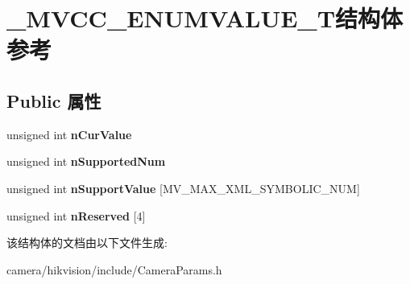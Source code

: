 \hypertarget{struct___m_v_c_c___e_n_u_m_v_a_l_u_e___t}{}\section{\+\_\+\+M\+V\+C\+C\+\_\+\+E\+N\+U\+M\+V\+A\+L\+U\+E\+\_\+\+T结构体 参考}
\label{struct___m_v_c_c___e_n_u_m_v_a_l_u_e___t}
\subsection*{Public 属性}
\begin{DoxyCompactItemize}
\item 
\mbox{\label{struct___m_v_c_c___e_n_u_m_v_a_l_u_e___t_ab30f0fe7ee9b0eacf1286584bf579b4a}} 
unsigned int {\bfseries n\+Cur\+Value}
\item 
\mbox{\label{struct___m_v_c_c___e_n_u_m_v_a_l_u_e___t_a1a43bc56d480394d927e8ded7ad94f62}} 
unsigned int {\bfseries n\+Supported\+Num}
\item 
\mbox{\label{struct___m_v_c_c___e_n_u_m_v_a_l_u_e___t_ac55c1e13011a2a27acfa614f76a55bf4}} 
unsigned int {\bfseries n\+Support\+Value} \mbox{[}M\+V\+\_\+\+M\+A\+X\+\_\+\+X\+M\+L\+\_\+\+S\+Y\+M\+B\+O\+L\+I\+C\+\_\+\+N\+UM\mbox{]}
\item 
\mbox{\label{struct___m_v_c_c___e_n_u_m_v_a_l_u_e___t_a9cf20dd217f5450569ccebd640003fd0}} 
unsigned int {\bfseries n\+Reserved} \mbox{[}4\mbox{]}
\end{DoxyCompactItemize}


该结构体的文档由以下文件生成\+:\begin{DoxyCompactItemize}
\item 
camera/hikvision/include/Camera\+Params.\+h\end{DoxyCompactItemize}
